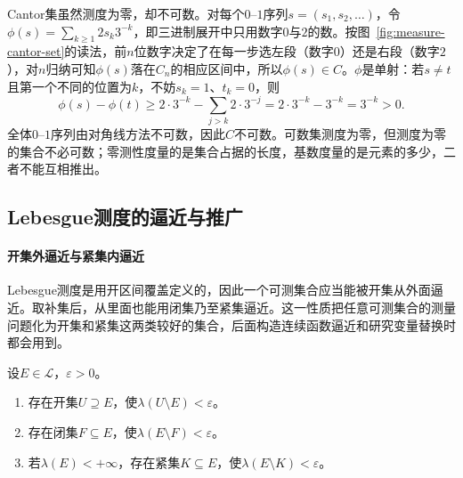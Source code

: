 Cantor集虽然测度为零，却不可数。对每个$0$--$1$序列$s=(s_1,s_2,\dots)$，令$\phi(s)=\sum_{k\ge1}2s_k3^{-k}$，即三进制展开中只用数字$0$与$2$的数。按图~\ref{fig:measure-cantor-set}的读法，前$n$位数字决定了在每一步选左段（数字$0$）还是右段（数字$2$），对$n$归纳可知$\phi(s)$落在$C_n$的相应区间中，所以$\phi(s)\in C$。$\phi$是单射：若$s\ne t$且第一个不同的位置为$k$，不妨$s_k=1$、$t_k=0$，则
\[
 \phi(s)-\phi(t)\ge2\cdot3^{-k}-\sum_{j>k}2\cdot3^{-j}=2\cdot3^{-k}-3^{-k}=3^{-k}>0.
\]
全体$0$--$1$序列由对角线方法不可数，因此$C$不可数。可数集测度为零，但测度为零的集合不必可数；零测性度量的是集合占据的长度，基数度量的是元素的多少，二者不能互相推出。

\subsection{Lebesgue测度的逼近与推广}
\label{sec:measure-lebesgue-approximation}

\paragraph{开集外逼近与紧集内逼近}
Lebesgue测度是用开区间覆盖定义的，因此一个可测集合应当能被开集从外面逼近。取补集后，从里面也能用闭集乃至紧集逼近。这一性质把任意可测集合的测量问题化为开集和紧集这两类较好的集合，后面构造连续函数逼近和研究变量替换时都会用到。

\begin{theorem}[Lebesgue测度的正则性]
\label{thm:measure-lebesgue-regularity}
设$E\in\mathcal L$，$\varepsilon>0$。
\begin{enumerate}
 \item 存在开集$U\supseteq E$，使$\lambda(U\setminus E)<\varepsilon$。
 \item 存在闭集$F\subseteq E$，使$\lambda(E\setminus F)<\varepsilon$。
 \item 若$\lambda(E)<+\infty$，存在紧集$K\subseteq E$，使$\lambda(E\setminus K)<\varepsilon$。
\end{enumerate}
\end{theorem}


